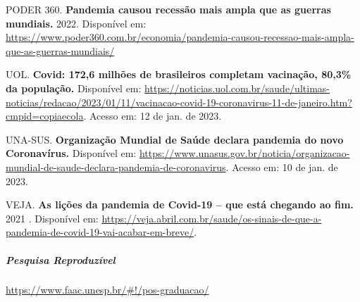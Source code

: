 \documentclass[
]{article}
\begin{document}
PODER 360. \textbf{Pandemia causou recessão mais ampla que as guerras
mundiais.} 2022. Disponível em:
\url{https://www.poder360.com.br/economia/pandemia-causou-recessao-mais-ampla-que-as-guerras-mundiais/}

UOL. \textbf{Covid: 172,6 milhões de brasileiros completam vacinação,
80,3\% da população.} Disponível em:
\url{https://noticias.uol.com.br/saude/ultimas-noticias/redacao/2023/01/11/vacinacao-covid-19-coronavirus-11-de-janeiro.htm?cmpid=copiaecola}.
Acesso em: 12 de jan. de 2023.

UNA-SUS. \textbf{Organização Mundial de Saúde declara pandemia do novo
Coronavírus.} Disponível em:
\url{https://www.unasus.gov.br/noticia/organizacao-mundial-de-saude-declara-pandemia-de-coronavirus}.
Acesso em: 10 de jan. de 2023.

VEJA. \textbf{As lições da pandemia de Covid-19 -- que está chegando ao
fim.} 2021 . Disponível em:
\url{https://veja.abril.com.br/saude/os-sinais-de-que-a-pandemia-de-covid-19-vai-acabar-em-breve/}.

\hypertarget{pesquisa-reproduzuxedvel}{%
\subparagraph{Pesquisa Reproduzível}\label{pesquisa-reproduzuxedvel}}

\url{https://www.faac.unesp.br/\#!/pos-graduacao/}
\end{document}
